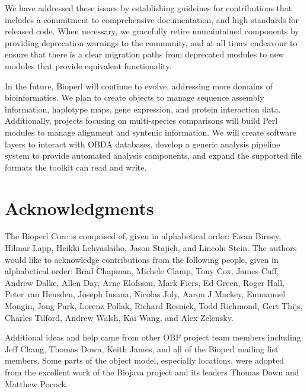 \documentclass[12pt]{article}
\begin{document}
We have addressed these issues by establishing guideines for
contributions that includes a commitment to comprehensive
documentation, and high standards for released code.  When necessary,
we gracefully retire unmaintained components by providing deprecation
warnings to the community, and at all times endeavour to ensure that
there is a clear migration paths from deprecated modules to new
modules that provide equivalent functionality.


In the future, Bioperl will continue to evolve, addressing more domains
of bioinformatics.  We plan to create objects to manage sequence
assembly information, haplotype maps, gene expression, and protein
interaction data.  Additionally, projects focusing on multi-species
comparisons will build Perl modules to manage alignment and syntenic
information.  We will create software layers to interact with OBDA
databases, develop a generic analysis pipeline system to provide
automated analysis components, and expand the supported file formats
the toolkit can read and write.

\section{Acknowledgments}

The Bioperl Core is comprised of, given in alphabetical order: Ewan
Birney, Hilmar Lapp, Heikki Lehv\"{a}slaiho, Jason Stajich, and
Lincoln Stein.  The authors would like to acknowledge contributions
from the following people, given in alphabetical order: Brad Chapman,
Michele Clamp, Tony Cox, James Cuff, Andrew Dalke, Allen Day, Arne
Elofsson, Mark Fiers, Ed Green, Roger Hall, Peter van Heusden, Joseph
Insana, Nicolas Joly, Aaron J Mackey, Emmanuel Mongin, Jong Park,
Lorenz Pollak, Richard Resnick, Todd Richmond, Gert Thijs, Charles
Tilford, Andrew Walsh, Kai Wang, and Alex Zelensky.

Additional ideas and help came from other OBF project team members
including Jeff Chang, Thomas Down, Keith James, and all of the Bioperl
mailing list members.  Some parts of the object model, especially
locations, were adopted from the excellent work of the Biojava project
and its leaders Thomas Down and Matthew Pocock.

\end{document}
